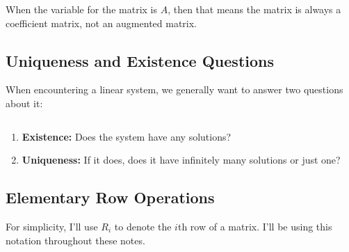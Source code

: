 \begin{note}
  \label{nte:coefficient_matrix}

  When the variable for the matrix is $A$, then that means the matrix is always
  a coefficient matrix, not an augmented matrix.
\end{note}

\subsection{Uniqueness and Existence Questions}
\label{sub_sec:uniqueness_and_existence_questions}

When encountering a linear system, we generally want to answer two questions
about it:

\begin{purpleframe}
  \label{prpl:two_fundamental_questions_about_a_linear_systems} $ $

  \begin{enumerate}
    \label{enum:two_fundamental_questions_for_linear_systems}

    \item \textbf{Existence:} Does the system have any solutions?
    \item \textbf{Uniqueness:} If it does, does it have infinitely many solutions
      or just one?
  \end{enumerate}
\end{purpleframe}


\subsection{Elementary Row Operations}
\label{sub_sec:elementary_row_operations}

\begin{notation}
  For simplicity, I'll use $R_i$ to denote the $i$th row of a matrix. I'll be
  using this notation throughout these notes.
\end{notation}

